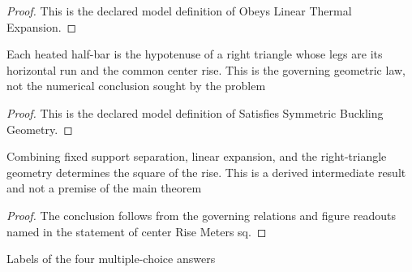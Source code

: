 \begin{proof}
  This is the declared model definition of Obeys Linear Thermal Expansion.
\end{proof}
\begin{definition}
  \label{def:physics:phyx-mini-0154:phyxminiproblems-problemphyxmini0154-satisfiessymmetricbucklinggeometry}
  Each heated half-bar is the hypotenuse of a right triangle whose legs are its horizontal run and the common center rise. This is the governing geometric law, not the numerical conclusion sought by the problem
\end{definition}
\begin{proof}
  This is the declared model definition of Satisfies Symmetric Buckling Geometry.
\end{proof}
\begin{lemma}
  \label{lem:physics:phyx-mini-0154:phyxminiproblems-problemphyxmini0154-centerrisemeters-sq}
  Combining fixed support separation, linear expansion, and the right-triangle geometry determines the square of the rise. This is a derived intermediate result and not a premise of the main theorem
\end{lemma}
\begin{proof}
  The conclusion follows from the governing relations and figure readouts named in the statement of center Rise Meters sq.
\end{proof}
\begin{definition}
  \label{def:physics:phyx-mini-0154:phyxminiproblems-problemphyxmini0154-answerchoice}
  Labels of the four multiple-choice answers
\end{definition}
